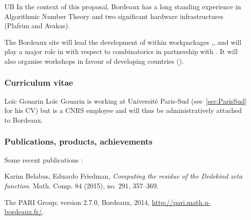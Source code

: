 \begin{sitedescription}{UB}
\medskip
In the context of this proposal, Bordeaux has a long standing experience in
Algorithmic Number Theory and two significant hardware infrastructures
(Plafrim and Avakas).

The Bordeaux site will lead the development of \PariGP within
workpackages ,,  and will play
a major role in  with respect to combinatorics in partnership with .
It will also organise workshops in favour of developing countries ().

\subsubsection*{Curriculum vitae}







\begin{participant}[type=R,PM=5,gender=male,salary=5600]{Lo\"ic Gouarin}
  Loïc Gouarin is working at Université Paris-Sud
  (see~\ref{sec:ParisSud} for his CV) but is a CNRS employee and will
  thus be administratively attached to Bordeaux.
\end{participant}



\subsubsection*{Publications, products, achievements}

Some recent publications :
\begin{compactenum}
\item 
Karim Belabas, Eduardo Friedman,
\textit{Computing the residue of the Dedekind zeta function}.
Math. Comp. 84 (2015), no. 291, 357--369. 

\item
The PARI Group; \PariGP version 2.7.0, Bordeaux, 2014,
\url{http://pari.math.u-bordeaux.fr/}.


\end{compactenum}
\end{sitedescription}
